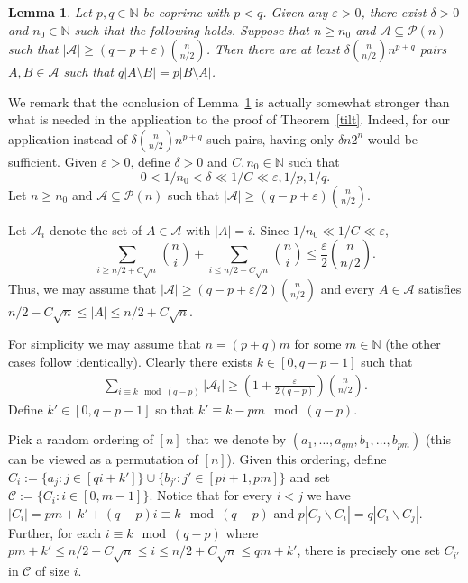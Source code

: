 \documentclass[11pt]{article}
\newtheorem{lemma}[theorem]{Lemma}
\numberwithin{equation}{section}
\def\P{\mathcal{P}}
\def\eps{\varepsilon}
\def\COMMENT#1{}
\begin{document}
\begin{lemma}\label{supertilt}
Let $p,q\in \mathbb N$ be coprime with $p<q$. 
Given any $\eps >0$, there exist $\delta >0$ and $n_0 \in \mathbb N$ such that the following holds. Suppose that $n \geq n_0$ and $\mathcal A\subseteq \P(n)$ such that 
$|\mathcal A|\geq (q-p+\eps) \binom{n}{n/2}$. Then there are at least $\delta \binom{n}{n/2} n^{p+q}$ pairs $A,B \in \mathcal A$ such that $q|A\setminus B|=p|B\setminus A|$.
\end{lemma}
We remark that the conclusion of Lemma~\ref{supertilt} is actually somewhat stronger than what is needed in the application to the proof of Theorem~\ref{tilt}.
Indeed, for our application instead of $\delta \binom{n}{n/2} n^{p+q}$  such pairs, having only $\delta n2^n$ would be sufficient.
\proof
Given $\eps >0$, define  $\delta >0$ and $C, n_0 \in \mathbb N$ such that
$$0<1/n_0 < \delta  \ll 1/C \ll \eps , 1/p,1/q.$$
Let $n\geq n_0$ and $\mathcal A\subseteq \P(n)$ such that 
$|\mathcal A|\geq (q-p+\eps) \binom{n}{n/2}$.

Let $\mathcal A_i$ denote the set of $A \in \mathcal A$ with $|A|=i$. Since $1/n_0 \ll 1/C \ll \eps$,
$$\sum _{i \geq n/2 +C \sqrt{n}} \binom{n}{i} +\sum _{i \leq n/2 -C \sqrt{n}} \binom{n}{i} \leq \frac{\eps}{2} \binom{n}{n/2}.$$
Thus, we may assume that $|\mathcal A|\geq (q-p+\eps/2) \binom{n}{n/2}$ and every $A \in \mathcal A$ satisfies
$n/2 -C \sqrt{n} \leq |A|\leq n/2 +C \sqrt{n}$.


For simplicity we may assume that $n=(p+q)m$ for some $m \in \mathbb N$ (the other cases follow identically). Clearly there exists $k \in [0,q-p-1]$ such that
\begin{align} \label{kbound}
\sum _{i \equiv k \mod (q-p)} |\mathcal A_i| \geq \left(1+ \frac{\eps}{2(q-p)}\right) \binom{n}{n/2}.
\end{align}
Define $k' \in [0, q-p-1]$ so that $k' \equiv k-pm \mod (q-p)$. 


Pick a random ordering of $[n]$ that we denote by $(a_1,  \ldots, a_{qm},b_1,\ldots,b_{pm})$ (this can be viewed as a permutation of $[n]$). Given this ordering, define $C_i:=\{a_j : j\in [qi+k']\}\cup\{b_{j'} : j'\in [pi+1,pm]\}$ and set $\mathcal{C}:=\{C_i : i\in [0,m-1]\}.$ 
Notice that for every $i<j$ we have $|C_i|=pm+k'+(q-p)i \equiv k \mod (q-p)$ and $p|C_j\backslash C_i|=q|C_i\backslash C_j|$. Further, for each $ i \equiv k \mod (q-p)$ where
$pm+k'\leq n/2 -C \sqrt{n} \leq i\leq n/2 +C \sqrt{n}\leq qm+k'$, there is precisely one set $C_{i'}$ in $\mathcal C$ of size $i$.\COMMENT{The size of $C_i$ range from $pm+k'$ up to $n$. $pm+k'$ is much smaller than $n/2 -C \sqrt{n}$, so all set sizes required are covered in $\mathcal C$}
\end{document}
